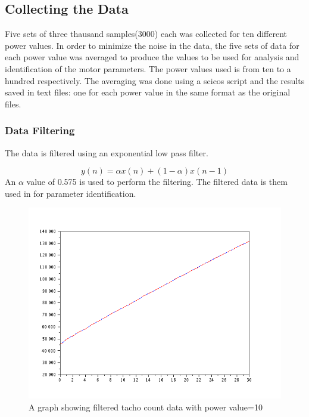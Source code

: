 \subsection{Collecting the Data}
\label{sec:data}

Five sets of three thausand samples(3000) each was collected for ten different power values. In order to minimize the noise in the data, the five sets of data for each power value was averaged to produce the values to be used for analysis and identification of the motor parameters. The power values used is from ten to a hundred respectively.
\newline
The averaging was done using a scicos script and the results saved in text files: one for each power value in the same format as the original files.

\subsubsection{Data Filtering}
\label{sec:dataFiltering}
The data is filtered using an exponential low pass filter.

\begin{equation}
y(n) = \alpha x(n) + (1 - \alpha)x(n-1)
\end{equation}
\newline
An $\alpha$ value of 0.575 is used to perform the filtering.
\newline
The filtered data is them used in for parameter identification.
\begin{figure}
\includegraphics[scale=0.5]{images/10_dat_orig+filtered.png}
\caption{A graph showing filtered tacho count data with power value=10}
\end{figure}

